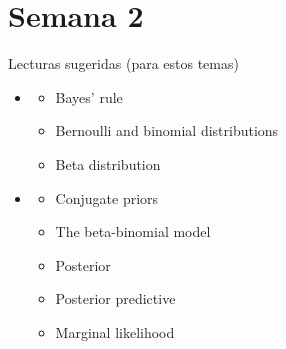 \part{Semana 2}

\begin{frame}
  \titlepage
\end{frame}

\begin{frame}{Lecturas sugeridas (para estos temas)}
\begin{itemize}
  \item {}
  \begin{itemize}
    \item {} Bayes' rule
    \item {} Bernoulli and binomial distributions
    \item {} Beta distribution
  \end{itemize}
  \vspace{0.4em}
  \item {}
  \begin{itemize}
    \item {} Conjugate priors
    \item {} The beta-binomial model
    \item {} Posterior
    \item {} Posterior predictive
    \item {} Marginal likelihood
  \end{itemize}
\end{itemize}
\end{frame}

